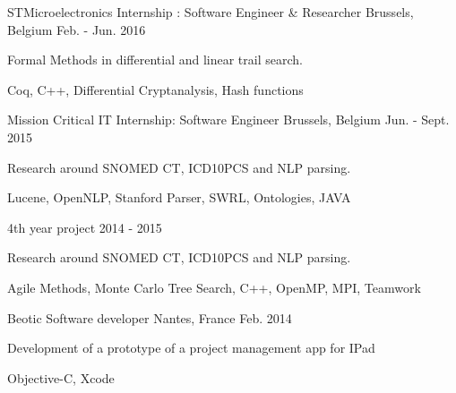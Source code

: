 

\begin{cventries}

  \cventrysix%
    {STMicroelectronics} %
    {Internship : Software Engineer \& Researcher} %
    {Brussels, Belgium} %
    {Feb. - Jun. 2016} %
    {
      \begin{cvitems} %
        \item {Formal Methods in differential and linear trail search.} %
      \end{cvitems}
    }%
    {Coq, C++, Differential Cryptanalysis, Hash functions}%

  \cventrysix%
    {Mission Critical IT} %
    {Internship: Software Engineer} %
    {Brussels, Belgium} %
    {Jun. - Sept. 2015} %
    {
      \begin{cvitems} %
        \item {Research around SNOMED CT, ICD10PCS and NLP parsing.}
      \end{cvitems}
    }%
    {Lucene, OpenNLP, Stanford Parser, SWRL, Ontologies, JAVA}%

  \cventrysix
    {} %
    {4th year project} %
    {} %
    {2014 - 2015} %
    {
      \begin{cvitems} %
        \item {Research around SNOMED CT, ICD10PCS and NLP parsing.}
      \end{cvitems}
    }%
    {Agile Methods, Monte Carlo Tree Search, C++, OpenMP, MPI, Teamwork}

  \cventrysix
    {Beotic} %
    {Software developer} %
    {Nantes, France} %
    {Feb. 2014} %
    {
      \begin{cvitems} %
        \item {Development of a prototype of a project management app for IPad}
      \end{cvitems}
    }%
    {Objective-C, Xcode}



\end{cventries}
